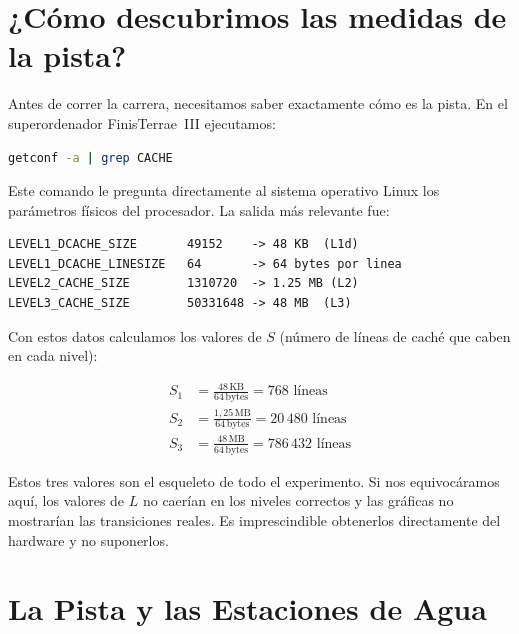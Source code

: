 \documentclass[12pt,a4paper]{article}
\begin{document}
\section{¿Cómo descubrimos las medidas de la pista?}
\label{sec:getconf}

Antes de correr la carrera, necesitamos saber exactamente cómo es la pista. En el superordenador FinisTerrae~III ejecutamos:

\begin{lstlisting}[language=bash, caption={Consulta de parámetros de caché al sistema operativo}]
getconf -a | grep CACHE
\end{lstlisting}

Este comando le pregunta directamente al sistema operativo Linux los parámetros físicos del procesador. La salida más relevante fue:

\begin{lstlisting}[numbers=none, caption={Salida real del FinisTerrae III}]
LEVEL1_DCACHE_SIZE       49152    -> 48 KB  (L1d)
LEVEL1_DCACHE_LINESIZE   64       -> 64 bytes por linea
LEVEL2_CACHE_SIZE        1310720  -> 1.25 MB (L2)
LEVEL3_CACHE_SIZE        50331648 -> 48 MB  (L3)
\end{lstlisting}

Con estos datos calculamos los valores de $S$ (número de líneas de caché que caben en cada nivel):

\begin{align}
  S_1 &= \frac{48\,\text{KB}}{64\,\text{bytes}} = 768 \text{ líneas} \\[4pt]
  S_2 &= \frac{1{,}25\,\text{MB}}{64\,\text{bytes}} = 20\,480 \text{ líneas} \\[4pt]
  S_3 &= \frac{48\,\text{MB}}{64\,\text{bytes}} = 786\,432 \text{ líneas}
\end{align}

\begin{tcolorbox}[clave, title={¿Por qué es crítico obtenerlos así?}]
Estos tres valores son el esqueleto de todo el experimento. Si nos equivocáramos aquí, los valores de $L$ no caerían en los niveles correctos y las gráficas no mostrarían las transiciones reales. Es imprescindible obtenerlos directamente del hardware y no suponerlos.
\end{tcolorbox}

\section{La Pista y las Estaciones de Agua}
\label{sec:pista}
\end{document}
